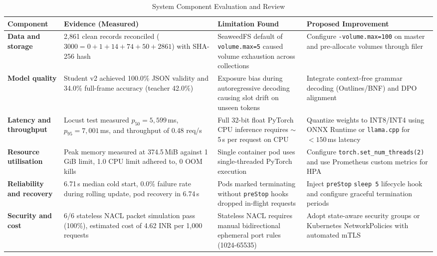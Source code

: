 \documentclass[10pt,a4paper]{article}
\begin{document}
\begin{table}[h]
\centering
\small
\caption{System Component Evaluation and Review}
\label{tab:review_table}
\begin{tabularx}{\textwidth}{|>{\bfseries}p{2.3cm}|p{3.4cm}|X|X|}
\hline
Component & Evidence (Measured) & Limitation Found & Proposed Improvement \\
\hline
Data and storage & 2,861 clean records reconciled ($3000 = 0 + 1 + 14 + 74 + 50 + 2861$) with SHA-256 hash & SeaweedFS default of \texttt{volume.max=5} caused volume exhaustion across collections & Configure \texttt{-volume.max=100} on master and pre-allocate volumes through filer \\
\hline
Model quality & Student v2 achieved 100.0\% JSON validity and 34.0\% full-frame accuracy (teacher 42.0\%) & Exposure bias during autoregressive decoding causing slot drift on unseen tokens & Integrate context-free grammar decoding (Outlines/BNF) and DPO alignment \\
\hline
Latency and throughput & Locust test measured $p_{50}=5,599$\,ms, $p_{95}=7,001$\,ms, and throughput of 0.48 req/s & Full 32-bit float PyTorch CPU inference requires $\sim$5\,s per request on CPU & Quantize weights to INT8/INT4 using ONNX Runtime or \texttt{llama.cpp} for $<150$\,ms latency \\
\hline
Resource utilisation & Peak memory measured at 374.5\,MiB against 1\,GiB limit, 1.0 CPU limit adhered to, 0 OOM kills & Single container pod uses single-threaded PyTorch execution & Configure \texttt{torch.set\_num\_threads(2)} and use Prometheus custom metrics for HPA \\
\hline
Reliability and recovery & 6.71\,s median cold start, 0.0\% failure rate during rolling update, pod recovery in 6.74\,s & Pods marked terminating without \texttt{preStop} hooks dropped in-flight requests & Inject \texttt{preStop} \texttt{sleep 5} lifecycle hook and configure graceful termination periods \\
\hline
Security and cost & 6/6 stateless NACL packet simulation pass (100\%), estimated cost of 4.62 INR per 1,000 requests & Stateless NACL requires manual bidirectional ephemeral port rules (1024-65535) & Adopt state-aware security groups or Kubernetes NetworkPolicies with automated mTLS \\
\hline
\end{tabularx}
\end{table}
\end{document}
